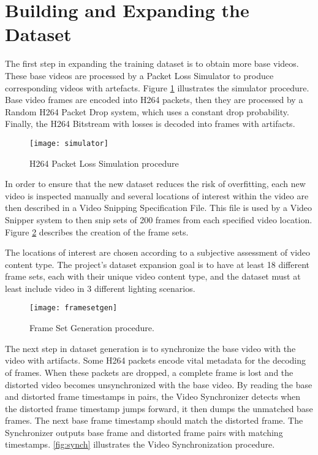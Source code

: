 \section{Building and Expanding the Dataset}
\label{sec:sol_dataset}

The first step in expanding the training dataset is to obtain more base videos. These base videos are processed by a Packet Loss Simulator to produce corresponding videos with artefacts. Figure \ref{fig:simulator} illustrates the simulator procedure. Base video frames are encoded into H264 packets, then they are processed by a Random H264 Packet Drop system, which uses a constant drop probability. Finally, the H264 Bitstream with losses is decoded into frames with artifacts.

\begin{figure} [!h]
  \centering
  
  \texttt{[image: simulator]}
  
  \caption{H264 Packet Loss Simulation procedure}
  \label{fig:simulator}

\end{figure}

In order to ensure that the new dataset reduces the risk of overfitting, each new video is inspected manually and several locations of interest within the video are then described in a Video Snipping Specification File. This file is used by a Video Snipper system to then snip sets of 200 frames from each specified video location. Figure \ref{fig:framesetgen} describes the creation of the frame sets.

The locations of interest are chosen according to a subjective assessment of video content type. The project's dataset expansion goal is to have at least 18 different frame sets, each with their unique video content type, and the dataset must at least include video in 3 different lighting scenarios.

\begin{figure} [!h]
  \centering
  
  \texttt{[image: framesetgen]}
  
  \caption{Frame Set Generation procedure.}
  \label{fig:framesetgen}

\end{figure}

The next step in dataset generation is to synchronize the base video with the video with artifacts. Some H264 packets encode vital metadata for the decoding of frames. When these packets are dropped, a complete frame is lost and the distorted video becomes unsynchronized with the base video. By reading the base and distorted frame timestamps in pairs, the Video Synchronizer detects when the distorted frame timestamp jumps forward, it then dumps the unmatched base frames. The next base frame timestamp should match the distorted frame. The Synchronizer outputs base frame and distorted frame pairs with matching timestamps. \ref{fig:synch} illustrates the Video Synchronization procedure.

